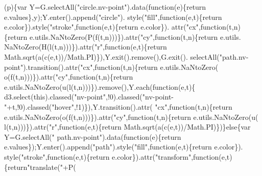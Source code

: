 \begin{DoxyCode}
      (p)\{var Y=G.selectAll(\textcolor{stringliteral}{"circle.nv-point"}).data(\textcolor{keyword}{function}(e)\{\textcolor{keywordflow}{return} e.values\},y);Y.enter().append(\textcolor{stringliteral}{"circle"}).
      style(\textcolor{stringliteral}{"fill"},\textcolor{keyword}{function}(e,t)\{\textcolor{keywordflow}{return} e.color\}).style(\textcolor{stringliteral}{"stroke"},\textcolor{keyword}{function}(e,t)\{\textcolor{keywordflow}{return} e.color\}).
      attr(\textcolor{stringliteral}{"cx"},\textcolor{keyword}{function}(t,n)\{\textcolor{keywordflow}{return} e.utils.NaNtoZero(P(f(t,n)))\}).attr(\textcolor{stringliteral}{"cy"},\textcolor{keyword}{function}(t,n)\{\textcolor{keywordflow}{return} e.utils.
      NaNtoZero(H(l(t,n)))\}).attr(\textcolor{stringliteral}{"r"},\textcolor{keyword}{function}(e,t)\{\textcolor{keywordflow}{return} Math.sqrt(a(c(e,t))/Math.PI)\}),Y.exit().remove(),G.exit().
      selectAll(\textcolor{stringliteral}{"path.nv-point"}).transition().attr(\textcolor{stringliteral}{"cx"},\textcolor{keyword}{function}(t,n)\{\textcolor{keywordflow}{return} e.utils.NaNtoZero(
      o(f(t,n)))\}).attr(\textcolor{stringliteral}{"cy"},\textcolor{keyword}{function}(t,n)\{\textcolor{keywordflow}{return} e.utils.NaNtoZero(u(l(t,n)))\}).\textcolor{keyword}{remove}(),Y.each(\textcolor{keyword}{function}(e,t)\{
      d3.select(\textcolor{keyword}{this}).classed(\textcolor{stringliteral}{"nv-point"},!0).classed(\textcolor{stringliteral}{"nv-point-"}+t,!0).classed(\textcolor{stringliteral}{"hover"},!1)\}),Y.transition().attr(\textcolor{stringliteral}{
      "cx"},\textcolor{keyword}{function}(t,n)\{\textcolor{keywordflow}{return} e.utils.NaNtoZero(o(f(t,n)))\}).attr(\textcolor{stringliteral}{"cy"},\textcolor{keyword}{function}(t,n)\{\textcolor{keywordflow}{return} e.utils.NaNtoZero(u(
      l(t,n)))\}).attr(\textcolor{stringliteral}{"r"},\textcolor{keyword}{function}(e,t)\{\textcolor{keywordflow}{return} Math.sqrt(a(c(e,t))/Math.PI)\})\}\textcolor{keywordflow}{else}\{var Y=G.selectAll(\textcolor{stringliteral}{"
      path.nv-point"}).data(\textcolor{keyword}{function}(e)\{\textcolor{keywordflow}{return} e.values\});Y.enter().append(\textcolor{stringliteral}{"path"}).style(\textcolor{stringliteral}{"fill"},\textcolor{keyword}{function}(e,t)\{\textcolor{keywordflow}{return} e.color\}).
      style(\textcolor{stringliteral}{"stroke"},\textcolor{keyword}{function}(e,t)\{\textcolor{keywordflow}{return} e.color\}).attr(\textcolor{stringliteral}{"transform"},\textcolor{keyword}{function}(e,t)\{\textcolor{keywordflow}{return}\textcolor{stringliteral}{"translate("}+P(

\end{DoxyCode}
